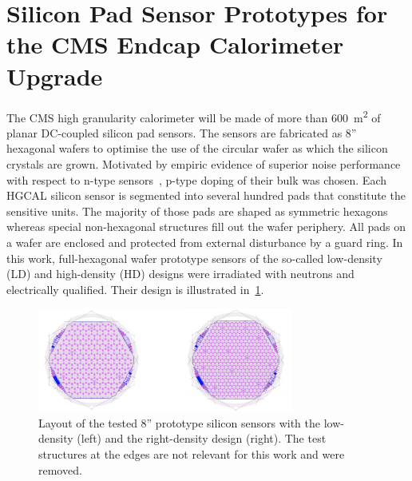 \section{Silicon Pad Sensor Prototypes for the CMS Endcap Calorimeter Upgrade}
\label{sec:sensors}

The CMS high granularity calorimeter will be made of more than \SI{600}{\metre\squared} of planar DC-coupled silicon pad sensors.
The sensors are fabricated as 8'' hexagonal wafers to optimise the use of the circular wafer as which the silicon crystals are grown.
Motivated by empiric evidence of superior noise performance with respect to n-type sensors~\cite{Adam_2017}, p-type doping of their bulk was chosen.
Each HGCAL silicon sensor is segmented into several hundred pads that constitute the sensitive units. 
The majority of those pads are shaped as symmetric hexagons whereas special non-hexagonal structures fill out the wafer periphery.
All pads on a wafer are enclosed and protected from external disturbance by a guard ring.\newline
In this work, full-hexagonal wafer prototype sensors of the so-called low-density (LD) and high-density (HD) designs were irradiated with neutrons and electrically qualified.
Their design is illustrated in~\ref{fig:Sensors}.

\begin{figure}[h]
	\centering
	\includegraphics[width=0.75\textwidth]{figures/sensor_layouts.png}
	\caption{
        Layout of the tested 8'' prototype silicon sensors with the low-density (left) and the right-density design (right).
        The test structures at the edges are not relevant for this work and were removed.
	}
	\label{fig:Sensors}
\end{figure}


